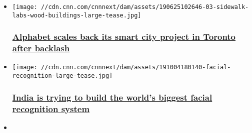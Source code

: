 \begin{itemize}
\item
  \href{/2019/10/31/tech/alphabet-smart-city-toronto/index.html}{}

  \texttt{[image: //cdn.cnn.com/cnnnext/dam/assets/190625102646-03-sidewalk-labs-wood-buildings-large-tease.jpg]}

  \hypertarget{alphabet-scales-back-its-smart-city-project-in-toronto-after-backlash}{%
  \subsubsection{\texorpdfstring{\href{/2019/10/31/tech/alphabet-smart-city-toronto/index.html}{Alphabet
  scales back its smart city project in Toronto after
  backlash}}{Alphabet scales back its smart city project in Toronto after backlash}}\label{alphabet-scales-back-its-smart-city-project-in-toronto-after-backlash}}
\item
  \href{/2019/10/17/tech/india-facial-recognition-intl-hnk/index.html}{}

  \texttt{[image: //cdn.cnn.com/cnnnext/dam/assets/191004180140-facial-recognition-large-tease.jpg]}

  \hypertarget{india-is-trying-to-build-the-worlds-biggest-facial-recognition-system}{%
  \subsubsection{\texorpdfstring{\href{/2019/10/17/tech/india-facial-recognition-intl-hnk/index.html}{India
  is trying to build the world's biggest facial recognition
  system}}{India is trying to build the world's biggest facial recognition system}}\label{india-is-trying-to-build-the-worlds-biggest-facial-recognition-system}}
\item
\end{itemize}

